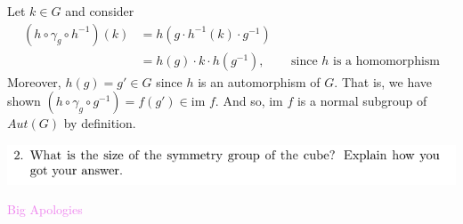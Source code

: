 \documentclass[12pt,letterpaper,boxed]{hmcpset}
\newcommand{\wg}[1]{\textcolor{violet}{#1}}
\newcommand{\im}{\text{im }}
\newcommand{\inv}{^{-1}}
\begin{document}
\begin{solution}
\begin{enumerate}
	Let $k \in G$ and consider 
	\begin{align*}
		(h \circ \gamma_g \circ h\inv)(k) &= h(g \cdot h\inv(k) \cdot g\inv) \\
			&= h(g) \cdot k \cdot h(g\inv), && \text{since $h$ is a homomorphism}
	\end{align*}
	Moreover, $h(g) = g' \in G$ since $h$ is an automorphism of $G$.
	That is, we have shown $(h \circ \gamma_g \circ g\inv) = f(g') \in
	\im f$. And so, $\im f$ is a normal subgroup of $Aut(G)$ by
	definition.

\end{enumerate}
\end{solution}

\newpage


\begin{problem}
	\includegraphics[scale=0.8]{2.png}
	\hfill
\end{problem}

\begin{solution}
\wg{Big Apologies}
\end{solution}

\newpage

\end{document}
